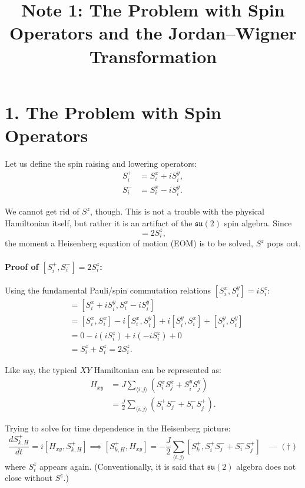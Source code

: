 \documentclass[11pt,a4paper]{article}
\title{\textbf{Note 1: The Problem with Spin Operators and the Jordan--Wigner Transformation}}
\date{}
\begin{document}
\maketitle

\section*{1. The Problem with Spin Operators}

Let us define the spin raising and lowering operators:
\begin{align}
    S_i^+ &= S_i^x + i S_i^y, \\
    S_i^- &= S_i^x - i S_i^y.
\end{align}

We cannot get rid of $S^z$, though. This is not a trouble with the physical Hamiltonian itself, but rather it is an artifact of the $\mathfrak{su}(2)$ spin algebra. Since
\begin{equation}
    [S_i^+, S_i^-] = 2 S_i^z,
\end{equation}
the moment a Heisenberg equation of motion (EOM) is to be solved, $S^z$ pops out.

\paragraph{Proof of $[S_i^+, S_i^-] = 2 S_i^z$:}
Using the fundamental Pauli/spin commutation relations $[S_i^x, S_i^y] = i S_i^z$:
\begin{align}
    [S_i^+, S_i^-] &= [S_i^x + i S_i^y, S_i^x - i S_i^y] \nonumber \\
    &= [S_i^x, S_i^x] - i [S_i^x, S_i^y] + i [S_i^y, S_i^x] + [S_i^y, S_i^y] \nonumber \\
    &= 0 - i (i S_i^z) + i (-i S_i^z) + 0 \nonumber \\
    &= S_i^z + S_i^z = 2 S_i^z.
\end{align}

Like say, the typical $XY$ Hamiltonian can be represented as:
\begin{align}
    H_{xy} &= J \sum_{\langle i,j \rangle} \left( S_i^x S_j^x + S_i^y S_j^y \right) \nonumber \\
    &= \frac{J}{2} \sum_{\langle i,j \rangle} \left( S_i^+ S_j^- + S_i^- S_j^+ \right).
\end{align}

Trying to solve for time dependence in the Heisenberg picture:
\begin{equation}
    \frac{d S_{k,H}^+}{dt} = i [H_{xy}, S_{k,H}^+] \implies [S_{k,H}^+, H_{xy}] = -\frac{J}{2} \sum_{\langle i,j \rangle} [S_k^+, S_i^+ S_j^- + S_i^- S_j^+] \quad \text{--- } (\dagger)
\end{equation}
where $S_i^z$ appears again. (Conventionally, it is said that $\mathfrak{su}(2)$ algebra does not close without $S^z$.)
\end{document}
